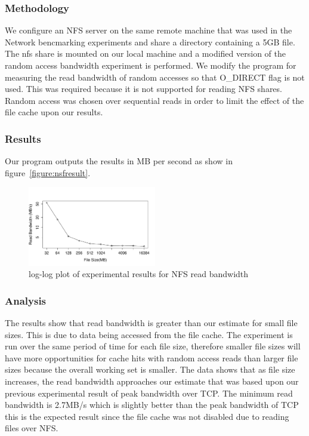 \subsubsection{Methodology}

We configure an NFS server on the same remote machine that was used in the Network bencmarking experiments and share a directory containing a 5GB file. The nfs share is mounted on our local machine and a 
modified version of the random access bandwidth experiment is performed. We modify the program for measuring the read bandwidth of random accesses so that O_DIRECT flag is not used. This was required because 
it is not supported for reading NFS shares. Random access was chosen over sequential reads in order to limit the effect of the file cache upon our results.

\subsubsection{Results}

Our program outputs the results in MB per second as show in figure~\ref{figure:nsfresult}.

\begin{figure}
    \centering
    \includegraphics[width=0.5\textwidth]{nfsresults.pdf}
    \caption{log-log plot of experimental results for NFS read bandwidth}
    \label{figure:nfsresult}
\end{figure}

\subsubsection{Analysis}

The results show that read bandwidth is greater than our estimate for small
file sizes. This is due to data being accessed from the file cache.  The
experiment is run over the same period of time for each file size, therefore
smaller file sizes will have more opportunities for cache hits with random
access reads than larger file sizes because the overall working set is smaller.
The data shows that as file size increases, the read bandwidth approaches our
estimate that was based upon our previous experimental result of peak bandwidth
over TCP. The minimum read bandwidth is 2.7MB/s which is slightly better than
the peak bandwidth of TCP this is the expected result since the file cache was
not disabled due to reading files over NFS.

